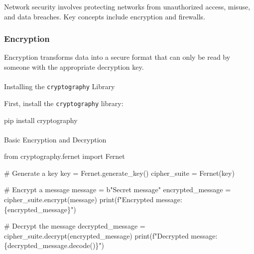 \documentclass[
  letterpaper,
  DIV=11,
  numbers=noendperiod]{scrreprt}
\makeatletter
\let\oldparagraph\paragraph
\renewcommand{\paragraph}{
    \@ifstar
      \xxxParagraphStar
      \xxxParagraphNoStar
  }
\newcommand{\xxxParagraphStar}[1]{\oldparagraph*{#1}\mbox{}}
\newcommand{\xxxParagraphNoStar}[1]{\oldparagraph{#1}\mbox{}}
\newenvironment{Shaded}{\begin{snugshade}}{\end{snugshade}}
\newcommand{\BuiltInTok}[1]{\textcolor[rgb]{0.00,0.23,0.31}{#1}}
\newcommand{\CommentTok}[1]{\textcolor[rgb]{0.37,0.37,0.37}{#1}}
\newcommand{\ExtensionTok}[1]{\textcolor[rgb]{0.00,0.23,0.31}{#1}}
\newcommand{\ImportTok}[1]{\textcolor[rgb]{0.00,0.46,0.62}{#1}}
\newcommand{\NormalTok}[1]{\textcolor[rgb]{0.00,0.23,0.31}{#1}}
\newcommand{\OperatorTok}[1]{\textcolor[rgb]{0.37,0.37,0.37}{#1}}
\newcommand{\SpecialCharTok}[1]{\textcolor[rgb]{0.37,0.37,0.37}{#1}}
\newcommand{\SpecialStringTok}[1]{\textcolor[rgb]{0.13,0.47,0.30}{#1}}
\newcommand{\StringTok}[1]{\textcolor[rgb]{0.13,0.47,0.30}{#1}}
\makeatother
\begin{document}
Network security involves protecting networks from unauthorized access,
misuse, and data breaches. Key concepts include encryption and
firewalls.

\subsubsection{Encryption}\label{encryption}

Encryption transforms data into a secure format that can only be read by
someone with the appropriate decryption key.

\paragraph{\texorpdfstring{Installing the \texttt{cryptography}
Library}{Installing the cryptography Library}}\label{installing-the-cryptography-library}

First, install the \texttt{cryptography} library:

\begin{Shaded}
\begin{Highlighting}[]
\ExtensionTok{pip}\NormalTok{ install cryptography}
\end{Highlighting}
\end{Shaded}

\paragraph{Basic Encryption and
Decryption}\label{basic-encryption-and-decryption}

\begin{Shaded}
\begin{Highlighting}[]
\ImportTok{from}\NormalTok{ cryptography.fernet }\ImportTok{import}\NormalTok{ Fernet}

\CommentTok{\# Generate a key}
\NormalTok{key }\OperatorTok{=}\NormalTok{ Fernet.generate\_key()}
\NormalTok{cipher\_suite }\OperatorTok{=}\NormalTok{ Fernet(key)}

\CommentTok{\# Encrypt a message}
\NormalTok{message }\OperatorTok{=} \StringTok{b"Secret message"}
\NormalTok{encrypted\_message }\OperatorTok{=}\NormalTok{ cipher\_suite.encrypt(message)}
\BuiltInTok{print}\NormalTok{(}\SpecialStringTok{f"Encrypted message: }\SpecialCharTok{\{}\NormalTok{encrypted\_message}\SpecialCharTok{\}}\SpecialStringTok{"}\NormalTok{)}

\CommentTok{\# Decrypt the message}
\NormalTok{decrypted\_message }\OperatorTok{=}\NormalTok{ cipher\_suite.decrypt(encrypted\_message)}
\BuiltInTok{print}\NormalTok{(}\SpecialStringTok{f"Decrypted message: }\SpecialCharTok{\{}\NormalTok{decrypted\_message}\SpecialCharTok{.}\NormalTok{decode()}\SpecialCharTok{\}}\SpecialStringTok{"}\NormalTok{)}
\end{Highlighting}
\end{Shaded}
\end{document}
